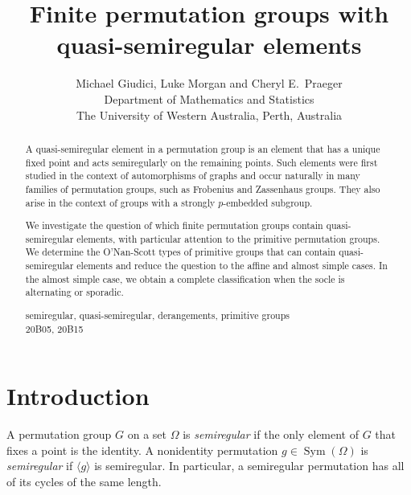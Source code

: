 \documentclass{article}
\title{Finite permutation groups with quasi-semiregular elements}
\author{Michael Giudici, Luke Morgan and  Cheryl E.~Praeger\\Department of Mathematics and Statistics\\
The University of Western Australia, Perth, Australia
}
\theoremstyle{remark}
\theoremstyle{definition}
\DeclareMathOperator{\Sym}{Sym}
\newcommand{\qsres}{quasi-semiregular elements}
\begin{document}
 



 \maketitle
 \begin{abstract}
 A quasi-semiregular element in a permutation group is an element that has a unique fixed point and acts semiregularly on the remaining points. Such elements were first studied in the context of automorphisms of graphs and occur naturally in many families of permutation groups, such as Frobenius and Zassenhaus groups. They also arise in the context of groups with a strongly $p$-embedded subgroup.
 
 We investigate the question of which finite permutation groups contain quasi-semiregular elements, with particular attention to the primitive permutation groups. We determine  the O'Nan-Scott types of primitive groups that can contain {\qsres} and reduce the question to the affine and almost simple cases. In the almost simple case, we obtain a complete classification when the socle is alternating  or  sporadic.

 \medskip


 semiregular, quasi-semiregular, derangements, primitive groups\\
 20B05, 20B15


 \end{abstract}

\section{Introduction}
 
A   permutation group $G$ on a set $\Omega$ is \emph{semiregular} if  the only element of $G$ that fixes a point is the identity. A nonidentity permutation $g\in \Sym(\Omega)$ is   \emph{semiregular} if $\langle g \rangle$ is semiregular. In particular, a semiregular permutation has all of its cycles of the same length. 

\medskip
\end{document}
